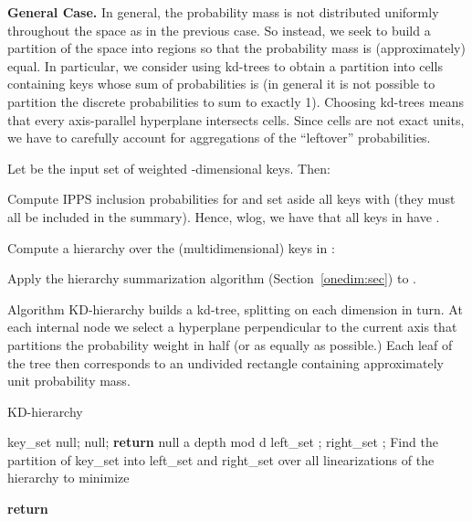 \documentclass[11pt]{article}
\begin{document}
\medskip
\noindent
{\bf General Case.}
In general, the probability mass is not distributed uniformly
throughout the space as in the previous case. 
So instead, we seek to build a partition of the space into regions so
that the probability mass is (approximately) equal. 
In particular, we consider using 
kd-trees to obtain a partition into cells containing keys whose
sum of probabilities is   
(in general it is not possible to partition the discrete probabilities
to sum to exactly 1). 
Choosing kd-trees means that 
every axis-parallel hyperplane intersects  cells.
Since cells are not exact units, 
we have to carefully account for aggregations of the
 ``leftover'' probabilities.

Let  be the input set of weighted -dimensional keys. 
Then:

\begin{list}{}{\leftmargin=1em}
\item
Compute IPPS inclusion probabilities for  and
set aside all keys with   
(they must all be included in the summary).  
Hence, wlog, we have that all keys in  have .
\item 
Compute a hierarchy  over the (multidimensional) keys in :

\item 
Apply the hierarchy summarization algorithm (Section~\ref{onedim:sec}) to .
\end{list}

Algorithm {\sc KD-hierarchy} builds a kd-tree, splitting on each
dimension in turn. 
 At each internal node we select a hyperplane perpendicular
 to the current axis that partitions the probability weight in half 
(or as equally as possible.) 
 Each leaf of the tree then corresponds to an undivided rectangle
containing approximately unit probability mass. 



\begin{algorithm}[t]
\caption{{\sc KD-hierarchy}}\label{kdhierarchy:alg}
\begin{algorithmic}[1]
\If {}
\State   key\_set
\State   null;  null; 
\State  \textbf{return } 
\Else
\State  null
\State a  depth mod d  
\State  
\Statex {}
\State left\_set ;
\State right\_set ;
\Else {}
\State Find the partition of key\_set into left\_set and right\_set
over all linearizations of the hierarchy to minimize

\EndIf
{}
\State \textbf{return}  
\EndIf
\end{algorithmic}
\end{algorithm}
\end{document}
